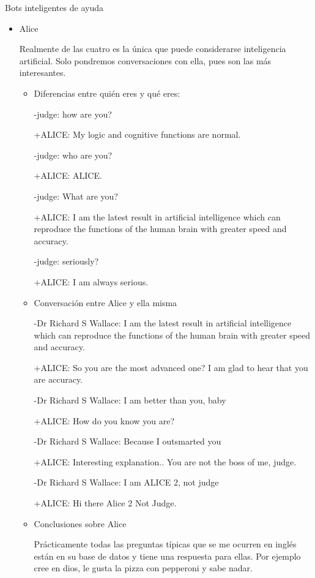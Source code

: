 \documentclass[spanish, a4paper, 12pt]{article} 	%
\begin{document}
\begin{section}{Bots inteligentes de ayuda}
\begin{itemize}
	Con esto basta para darse cuenta que está lejos de poder ser denominado inteligencia artificial.
		\item{Alice}
		
		Realmente de las cuatro es la única que puede considerarse inteligencia artificial.
		Solo pondremos conversaciones con ella, pues son las más interesantes.
		
		\begin{itemize}
			\item{Diferencias entre quién eres y qué eres:}
			
			-judge: how are you? 
			
			+ALICE: My logic and cognitive functions are normal. 
			
			-judge: who are you? 
			
			+ALICE: ALICE. 
			
			-judge: What are you? 
			
			+ALICE: I am the latest result in artificial intelligence which can reproduce the functions of the human brain with 					greater speed and accuracy. 
			
			-judge: seriously? 
			
			+ALICE: I am always serious.
		
		
		\item{Conversación entre Alice y ella misma}
		
			-Dr Richard S Wallace: I am the latest result in artificial intelligence which can reproduce the functions of the 						human brain with greater speed and accuracy. 
			
			+ALICE: So you are the most advanced one? I am glad to hear that you are accuracy. 
			
			-Dr Richard S Wallace: I am better than you, baby 
			
			+ALICE: How do you know you are? 

			-Dr Richard S Wallace: Because I outsmarted you 
			
			+ALICE: Interesting explanation.. You are not the boss of me, judge. 
			
			-Dr Richard S Wallace: I am ALICE 2, not judge 
			
			+ALICE: Hi there Alice 2 Not Judge. 
			
		\item{Conclusiones sobre Alice}
			
			Prácticamente todas las preguntas típicas que se me ocurren en inglés están en su base de datos y tiene una respuesta para ellas. Por ejemplo cree en dios, le gusta la pizza con pepperoni y sabe nadar. 
			

\end{itemize}
\end{itemize}
\end{section}
\end{document}
